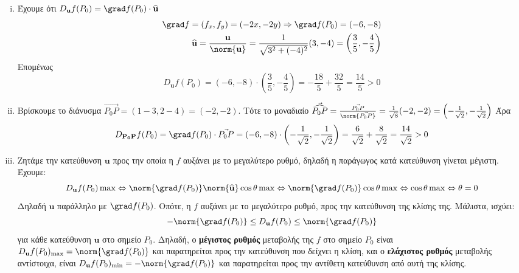 \begin{solution}
  \begin{enumerate}[i)]
    \item Έχουμε ότι $ D_{\mathbf{u}}f(P_{0}) = \grad f(P_{0}) \cdot 
      \mathbf{\widehat{u}} $
      \begin{align*}
        \grad f = (f_{x}, f_{y}) = (-2x, -2y) \Rightarrow \grad f(P_{0}) = (-6,-8) \\
        \mathbf{\widehat{u}} = \frac{\mathbf{u}}{\norm{\mathbf{u}}} =
        \frac{1}{\sqrt{3^{2}+(-4)^{2}}} (3,-4) = \left(\frac{3}{5} , - 
        \frac{4}{5}\right)
      \end{align*} 
      Επομένως
      \[
        D_{\mathbf{u}}f(P_{0}) = (-6,-8) \cdot \left(\frac{3}{5} , - \frac{4}{5}\right) 
        = - \frac{18}{5} + \frac{32}{5} = \frac{14}{5} > 0
      \] 
    \item Βρίσκουμε το διάνυσμα $ \vec{P_{0}P} = (1-3,2-4) = (-2,-2) $. Τότε το 
      μοναδιαίο $ \vec{\widehat{P_{0}P}} =
      \frac{\vec{P_{0}P}}{\norm{\vec{P_{0}P}}} = \frac{1}{\sqrt{8}} (-2,-2) = \left(-
      \frac{1}{\sqrt{2}} , - \frac{1}{\sqrt{2}}\right) $
      Άρα 
      \[
        D_{\mathbf{P_{0}P}}f(P_{0}) = \grad f(P_{0}) \cdot \vec{P_{0}P} = (-6,-8) 
        \cdot \left(- \frac{1}{\sqrt{2}} , - \frac{1}{\sqrt{2}}\right) = 
        \frac{6}{\sqrt{2}} + \frac{8}{\sqrt{2}} = \frac{14}{\sqrt{2}} > 0
      \] 
    \item Ζητάμε την κατεύθυνση $ \mathbf{u} $ προς την οποία η $f$ αυξάνει με το 
      μεγαλύτερο ρυθμό, δηλαδή η παράγωγος κατά κατεύθυνση γίνεται μέγιστη. Έχουμε:
      \[
        D_{\mathbf{u}}f(P_{0}) \max \Leftrightarrow \norm{\grad f (P_{0})}
        \norm{\mathbf{\widehat{u}}} \cos{\theta} \max \Leftrightarrow 
        \norm{\grad f(P_{0})} \cos{\theta} \max \Leftrightarrow \cos{\theta} \max
        \Leftrightarrow \theta = 0
      \]
      Δηλαδή $ \mathbf{u} $ παράλληλο με $ \grad f(P_{0}) $. Οπότε, η $f$ αυξάνει με 
      το μεγαλύτερο ρυθμό, προς την κατεύθυνση της κλίσης της. Μάλιστα, ισχύει:
      \[
        - \norm{\grad f(P_{0})} \leq D_{\mathbf{u}} f(P_{0}) \leq \norm{\grad f(P_{0})}
      \]
      για κάθε κατεύθυνση $ \mathbf{u} $ στο σημείο $ P_{0} $. 
      Δηλαδή, ο \textbf{μέγιστος ρυθμός} μεταβολής της $f$ στο σημείο $ P_{0} $ είναι $
      D_{\mathbf{u}}f(P_{0})_{\max} = \norm{\grad f(P_{0})} $ και παρατηρείται προς 
      την κατεύθυνση που δείχνει η κλίση, και ο \textbf{ελάχιστος ρυθμός} μεταβολής
      αντίστοιχα, είναι $ D_{\mathbf{u}}f(P_{0})_{\min} = -\norm{\grad f(P_{0})} $ 
      και παρατηρείται προς την αντίθετη κατεύθυνση από αυτή της κλίσης.

\end{enumerate}
\end{solution}
